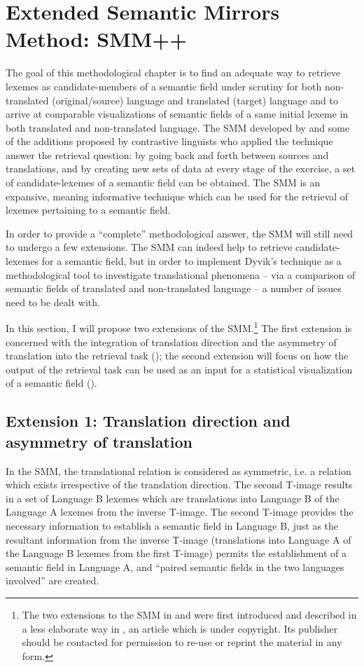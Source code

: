 \section{Extended Semantic Mirrors Method: SMM++}
\label{sec:3.5}
The goal of this methodological chapter is to find an adequate way to retrieve lexemes as candidate-members of a semantic field under scrutiny for both non-translated (original\slash source) language and translated (target) language and to arrive at comparable visualizations of semantic fields of a same initial lexeme in both translated and non-translated language. The SMM developed by \citet{johansson_translational_1998,langemets_translations_2005} and some of the additions proposed by contrastive linguists who applied the technique answer the retrieval\textbf{ }question: by going back and forth between sources and translations, and by creating new sets of data at every stage of the exercise, a set of candidate-lexemes of a semantic field can be obtained. The SMM is an expansive, meaning informative technique which can be used for the retrieval of lexemes pertaining to a semantic field.

In order to provide a ``complete'' methodological answer, the SMM will still need to undergo a few extensions. The SMM can indeed help to retrieve candidate-lexemes for a semantic field, but in order to implement Dyvik’s technique as a methodological tool to investigate translational phenomena – via a comparison of semantic fields of translated and non-translated language – a number of issues need to be dealt with.

In this section, I will propose two extensions of the SMM.\footnote{The two extensions to the SMM in  and  were first introduced and described in a less elaborate way in \citet{vandevoorde_corpus-based_2017}, an article which is under copyright. Its publisher should be contacted for permission to re-use or reprint the material in any form.} The first extension is concerned with the integration of translation direction and the asymmetry of translation into the retrieval task (); the second extension will focus on how the output of the retrieval task can be used as an input for a statistical visualization of a semantic field ().

\subsection{Extension 1: Translation direction and asymmetry of translation}
\label{sec:3.5.1}
In the SMM, the translational relation is considered as symmetric, i.e. a relation which exists irrespective of the translation direction. The second T-image results in a set of Language B lexemes which are translations into Language B of the Language A lexemes from the inverse T-image. The second T-image provides the necessary information to establish a semantic field in Language B, just as the resultant information from the inverse T-image (translations into Language A of the Language B lexemes from the first T-image) permits the establishment of a semantic field in Language A, and “paired semantic fields in the two languages involved” \citep[33]{langemets_translations_2005} are created.

